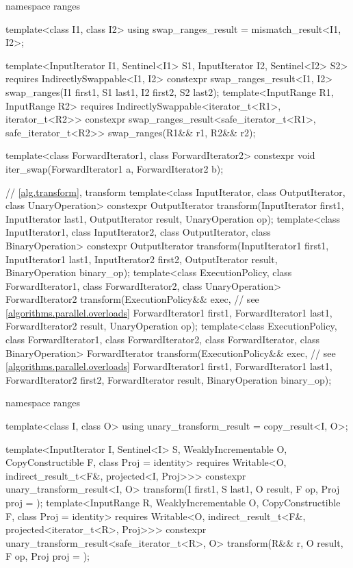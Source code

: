\begin{codeblock}
{  namespace ranges {
    template<class I1, class I2>
    using swap_ranges_result = mismatch_result<I1, I2>;

    template<InputIterator I1, Sentinel<I1> S1, InputIterator I2, Sentinel<I2> S2>
      requires IndirectlySwappable<I1, I2>
      constexpr swap_ranges_result<I1, I2>
        swap_ranges(I1 first1, S1 last1, I2 first2, S2 last2);
    template<InputRange R1, InputRange R2>
      requires IndirectlySwappable<iterator_t<R1>, iterator_t<R2>>
      constexpr swap_ranges_result<safe_iterator_t<R1>, safe_iterator_t<R2>>
        swap_ranges(R1&& r1, R2&& r2);
  }

  template<class ForwardIterator1, class ForwardIterator2>
    constexpr void iter_swap(ForwardIterator1 a, ForwardIterator2 b);

  // \ref{alg.transform}, transform
  template<class InputIterator, class OutputIterator, class UnaryOperation>
    constexpr OutputIterator
      transform(InputIterator first1, InputIterator last1,
                OutputIterator result, UnaryOperation op);
  template<class InputIterator1, class InputIterator2, class OutputIterator,
           class BinaryOperation>
    constexpr OutputIterator
      transform(InputIterator1 first1, InputIterator1 last1,
                InputIterator2 first2, OutputIterator result,
                BinaryOperation binary_op);
  template<class ExecutionPolicy, class ForwardIterator1, class ForwardIterator2,
           class UnaryOperation>
    ForwardIterator2
      transform(ExecutionPolicy&& exec, // see \ref{algorithms.parallel.overloads}
                ForwardIterator1 first1, ForwardIterator1 last1,
                ForwardIterator2 result, UnaryOperation op);
  template<class ExecutionPolicy, class ForwardIterator1, class ForwardIterator2,
           class ForwardIterator, class BinaryOperation>
    ForwardIterator
      transform(ExecutionPolicy&& exec, // see \ref{algorithms.parallel.overloads}
                ForwardIterator1 first1, ForwardIterator1 last1,
                ForwardIterator2 first2, ForwardIterator result,
                BinaryOperation binary_op);

  namespace ranges {
    template<class I, class O>
    using unary_transform_result = copy_result<I, O>;

    template<InputIterator I, Sentinel<I> S, WeaklyIncrementable O,
             CopyConstructible F, class Proj = identity>
      requires Writable<O, indirect_result_t<F&, projected<I, Proj>>>
      constexpr unary_transform_result<I, O>
        transform(I first1, S last1, O result, F op, Proj proj = {});
    template<InputRange R, WeaklyIncrementable O, CopyConstructible F,
             class Proj = identity>
      requires Writable<O, indirect_result_t<F&, projected<iterator_t<R>, Proj>>>
      constexpr unary_transform_result<safe_iterator_t<R>, O>
        transform(R&& r, O result, F op, Proj proj = {});

}}
\end{codeblock}
